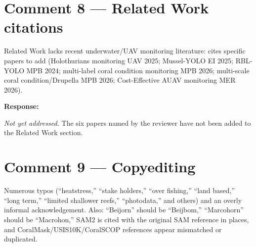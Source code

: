 \documentclass[12pt]{article}
\newenvironment{reviewercomment}{%
  \begin{mdframed}[backgroundcolor=gray!10,linecolor=gray!40,
                   leftmargin=0pt,rightmargin=0pt,
                   innerleftmargin=8pt,innerrightmargin=8pt,
                   innertopmargin=6pt,innerbottommargin=6pt]
  \itshape\color{quotegray}%
}{%
  \end{mdframed}%
}
\newenvironment{response}{%
  \vspace{4pt}%
  \color{respblue}%
  \noindent\textbf{Response:}\space
}{%
  \vspace{10pt}%
}
\begin{document}
\section*{Comment 8 --- Related Work citations}

\begin{reviewercomment}
Related Work lacks recent underwater/UAV monitoring literature: cites specific
papers to add (Holothurians monitoring UAV 2025; Mussel-YOLO EI 2025;
RBL-YOLO MPB 2024; multi-label coral condition monitoring MPB 2026;
multi-scale coral condition/Drupella MPB 2026; Cost-Effective AUAV monitoring
MER 2026).
\end{reviewercomment}

\begin{response}
\textit{Not yet addressed.}  The six papers named by the reviewer have not been
added to the Related Work section.
\end{response}

\section*{Comment 9 --- Copyediting}

\begin{reviewercomment}
Numerous typos (``heatstress,'' ``stake holders,'' ``over fishing,'' ``land
based,'' ``long term,'' ``limited shallower reefs,'' ``photodata,'' and others)
and an overly informal acknowledgement.  Also: ``Beijorn'' should be
``Beijbom,'' ``Marcohorn'' should be ``Macrohon,'' SAM2 is cited with the
original SAM reference in places, and CoralMask/USIS10K/CoralSCOP references
appear mismatched or duplicated.
\end{reviewercomment}
\end{document}
